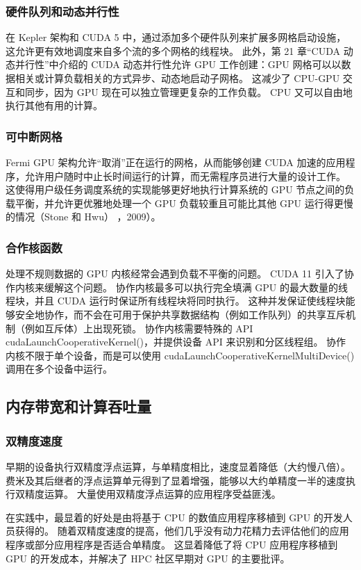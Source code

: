 \subsubsection{硬件队列和动态并行性}
在 Kepler 架构和 CUDA 5 中，通过添加多个硬件队列来扩展多网格启动设施，这允许更有效地调度来自多个流的多个网格的线程块。 此外，第 21 章“CUDA 动态并行性”中介绍的 CUDA 动态并行性允许 GPU 工作创建：GPU 网格可以以数据相关或计算负载相关的方式异步、动态地启动子网格。 这减少了 CPU-GPU 交互和同步，因为 GPU 现在可以独立管理更复杂的工作负载。 CPU 又可以自由地执行其他有用的计算。

\subsubsection{可中断网格}
Fermi GPU 架构允许“取消”正在运行的网格，从而能够创建 CUDA 加速的应用程序，允许用户随时中止长时间运行的计算，而无需程序员进行大量的设计工作。 这使得用户级任务调度系统的实现能够更好地执行计算系统的 GPU 节点之间的负载平衡，并允许更优雅地处理一个 GPU 负载较重且可能比其他 GPU 运行得更慢的情况（Stone 和 Hwu） ，2009）。

\subsubsection{合作核函数}
处理不规则数据的 GPU 内核经常会遇到负载不平衡的问题。 CUDA 11 引入了协作内核来缓解这个问题。 协作内核最多可以执行完全填满 GPU 的最大数量的线程块，并且 CUDA 运行时保证所有线程块将同时执行。 这种并发保证使线程块能够安全地协作，而不会在可用于保护共享数据结构（例如工作队列）的共享互斥机制（例如互斥体）上出现死锁。 协作内核需要特殊的 API cudaLaunchCooperativeKernel()，并提供设备 API 来识别和分区线程组。 协作内核不限于单个设备，而是可以使用 cudaLaunchCooperativeKernelMultiDevice() 调用在多个设备中运行。

\subsection{内存带宽和计算吞吐量}
\subsubsection{双精度速度}
早期的设备执行双精度浮点运算，与单精度相比，速度显着降低（大约慢八倍）。 费米及其后继者的浮点运算单元得到了显着增强，能够以大约单精度一半的速度执行双精度运算。 大量使用双精度浮点运算的应用程序受益匪浅。

在实践中，最显着的好处是由将基于 CPU 的数值应用程序移植到 GPU 的开发人员获得的。 随着双精度速度的提高，他们几乎没有动力花精力去评估他们的应用程序或部分应用程序是否适合单精度。 这显着降低了将 CPU 应用程序移植到 GPU 的开发成本，并解决了 HPC 社区早期对 GPU 的主要批评。

